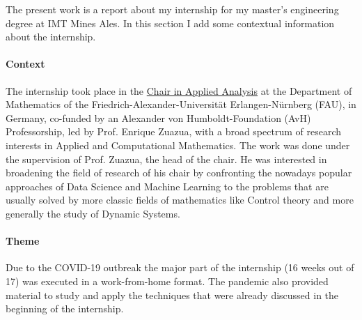 \documentclass[12pt, letterpaper]{article}
\begin{document}
\begin{itemize}
The present work is a report about my internship for my master's engineering degree at IMT Mines Ales. In this section I add some contextual information about the internship.

\paragraph{Context} The internship took place in the \href{https://en.www.math.fau.de/applied-analysis/}{Chair 
in Applied Analysis} at the Department of Mathematics of the Friedrich-Alexander-Universität Erlangen-Nürnberg (FAU), in Germany, co-funded by an Alexander von Humboldt-Foundation (AvH) Professorship, led by Prof. Enrique Zuazua, with a broad spectrum of research interests in Applied and Computational Mathematics. 
The work was done under the supervision of Prof. Zuazua, the head of the chair. 
He was interested in broadening the field of research of his chair by confronting the nowadays popular approaches of Data Science and Machine Learning to the problems that are usually solved by more classic fields of mathematics like Control theory and more generally the study of Dynamic Systems. 

\paragraph{Theme} Due to the COVID-19 outbreak the major part of the internship (16 weeks out of 17) was executed in a work-from-home format. 
The pandemic also provided material to study and apply the techniques that were already discussed in the beginning of the internship.
 

\end{itemize}
\end{document}
